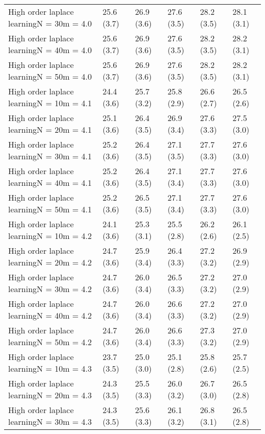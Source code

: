 \documentclass{article}
\begin{document}
\begin{table*}[t!]
\begin{center}
\begin{small}
\begin{sc}
\begin{tabular}{llllll}
High order laplace learningN = 30m = 4.0&25.6 (3.7)      &26.9 (3.6)      &27.6 (3.5)      &28.2 (3.5)      &28.1 (3.1)      \\
High order laplace learningN = 40m = 4.0&25.6 (3.7)      &26.9 (3.6)      &27.6 (3.5)      &28.2 (3.5)      &28.2 (3.1)      \\
High order laplace learningN = 50m = 4.0&25.6 (3.7)      &26.9 (3.6)      &27.6 (3.5)      &28.2 (3.5)      &28.2 (3.1)      \\
High order laplace learningN = 10m = 4.1&24.4 (3.6)      &25.7 (3.2)      &25.8 (2.9)      &26.6 (2.7)      &26.5 (2.6)      \\
High order laplace learningN = 20m = 4.1&25.1 (3.6)      &26.4 (3.5)      &26.9 (3.4)      &27.6 (3.3)      &27.5 (3.0)      \\
High order laplace learningN = 30m = 4.1&25.2 (3.6)      &26.4 (3.5)      &27.1 (3.5)      &27.7 (3.3)      &27.6 (3.0)      \\
High order laplace learningN = 40m = 4.1&25.2 (3.6)      &26.4 (3.5)      &27.1 (3.4)      &27.7 (3.3)      &27.6 (3.0)      \\
High order laplace learningN = 50m = 4.1&25.2 (3.6)      &26.5 (3.5)      &27.1 (3.4)      &27.7 (3.3)      &27.6 (3.0)      \\
High order laplace learningN = 10m = 4.2&24.1 (3.6)      &25.3 (3.1)      &25.5 (2.8)      &26.2 (2.6)      &26.1 (2.5)      \\
High order laplace learningN = 20m = 4.2&24.7 (3.6)      &25.9 (3.4)      &26.4 (3.3)      &27.2 (3.2)      &26.9 (2.9)      \\
High order laplace learningN = 30m = 4.2&24.7 (3.6)      &26.0 (3.4)      &26.5 (3.3)      &27.2 (3.2)      &27.0 (2.9)      \\
High order laplace learningN = 40m = 4.2&24.7 (3.6)      &26.0 (3.4)      &26.6 (3.3)      &27.2 (3.2)      &27.0 (2.9)      \\
High order laplace learningN = 50m = 4.2&24.7 (3.6)      &26.0 (3.4)      &26.6 (3.3)      &27.3 (3.2)      &27.0 (2.9)      \\
High order laplace learningN = 10m = 4.3&23.7 (3.5)      &25.0 (3.0)      &25.1 (2.8)      &25.8 (2.6)      &25.7 (2.5)      \\
High order laplace learningN = 20m = 4.3&24.3 (3.5)      &25.5 (3.3)      &26.0 (3.2)      &26.7 (3.0)      &26.5 (2.8)      \\
High order laplace learningN = 30m = 4.3&24.3 (3.5)      &25.6 (3.3)      &26.1 (3.2)      &26.8 (3.1)      &26.5 (2.8)      \\

\end{tabular}
\end{sc}
\end{small}
\end{center}
\end{table*}
\end{document}
